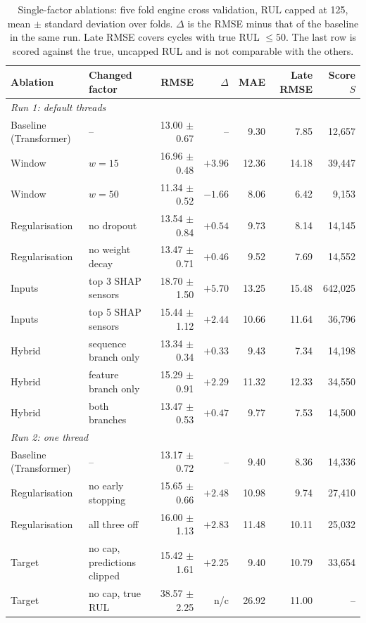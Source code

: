 \begin{table}[t]
\centering
\caption{Single-factor ablations: five fold engine cross validation, RUL
capped at 125, mean $\pm$ standard deviation over folds. $\Delta$ is the RMSE
minus that of the baseline in the same run. Late RMSE covers cycles with
true RUL $\le 50$. The last row is scored against the true, uncapped RUL and
is not comparable with the others.}
\label{tab:ablations}
\footnotesize
\begin{tabular}{llrrrrr}
\hline
Ablation & Changed factor & RMSE & $\Delta$ & MAE & Late RMSE & Score $S$ \\
\hline
\multicolumn{7}{l}{\emph{Run 1: default threads}} \\
Baseline (Transformer) & -- & 13.00 $\pm$ 0.67 & -- & 9.30 & 7.85 & 12,657 \\
Window & $w = 15$ & 16.96 $\pm$ 0.48 & $+3.96$ & 12.36 & 14.18 & 39,447 \\
Window & $w = 50$ & 11.34 $\pm$ 0.52 & $-1.66$ & 8.06 & 6.42 & 9,153 \\
Regularisation & no dropout & 13.54 $\pm$ 0.84 & $+0.54$ & 9.73 & 8.14 & 14,145 \\
Regularisation & no weight decay & 13.47 $\pm$ 0.71 & $+0.46$ & 9.52 & 7.69 & 14,552 \\
Inputs & top 3 SHAP sensors & 18.70 $\pm$ 1.50 & $+5.70$ & 13.25 & 15.48 & 642,025 \\
Inputs & top 5 SHAP sensors & 15.44 $\pm$ 1.12 & $+2.44$ & 10.66 & 11.64 & 36,796 \\
Hybrid & sequence branch only & 13.34 $\pm$ 0.34 & $+0.33$ & 9.43 & 7.34 & 14,198 \\
Hybrid & feature branch only & 15.29 $\pm$ 0.91 & $+2.29$ & 11.32 & 12.33 & 34,550 \\
Hybrid & both branches & 13.47 $\pm$ 0.53 & $+0.47$ & 9.77 & 7.53 & 14,500 \\
\hline
\multicolumn{7}{l}{\emph{Run 2: one thread}} \\
Baseline (Transformer) & -- & 13.17 $\pm$ 0.72 & -- & 9.40 & 8.36 & 14,336 \\
Regularisation & no early stopping & 15.65 $\pm$ 0.66 & $+2.48$ & 10.98 & 9.74 & 27,410 \\
Regularisation & all three off & 16.00 $\pm$ 1.13 & $+2.83$ & 11.48 & 10.11 & 25,032 \\
Target & no cap, predictions clipped & 15.42 $\pm$ 1.61 & $+2.25$ & 9.40 & 10.79 & 33,654 \\
Target & no cap, true RUL & 38.57 $\pm$ 2.25 & n/c & 26.92 & 11.00 & -- \\
\hline
\end{tabular}
\end{table}

